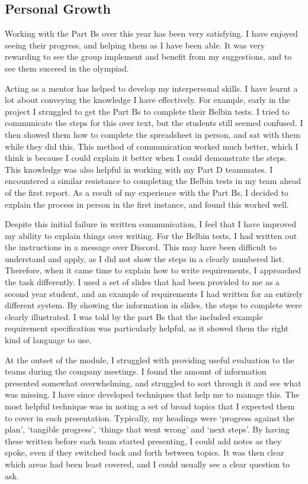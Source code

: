    \subsection{Personal Growth}\label{subsec:reflection-personal}
        Working with the Part Bs over this year has been very satisfying.
        I have enjoyed seeing their progress, and helping them as I have been able.
        It was very rewarding to see the group implement and benefit from my suggestions, and to see them succeed in the olympiad.

        Acting as a mentor has helped to develop my interpersonal skills.
        I have learnt a lot about conveying the knowledge I have effectively.
        For example, early in the project I struggled to get the Part Bs to complete their Belbin tests.
        I tried to communicate the steps for this over text, but the students still seemed confused.
        I then showed them how to complete the spreadsheet in person, and sat with them while they did this.
        This method of communication worked much better, which I think is because I could explain it better when I could demonstrate the steps.
        This knowledge was also helpful in working with my Part D teammates.
        I encountered a similar resistance to completing the Belbin tests in my team ahead of the first report.
        As a result of my experience with the Part Bs, I decided to explain the process in person in the first instance, and found this worked well.

        Despite this initial failure in written communication, I feel that I have improved my ability to explain things over writing.
        For the Belbin tests, I had written out the instructions in a message over Discord. %
        This may have been difficult to understand and apply, as I did not show the steps in a clearly numbered list.
        Therefore, when it came time to explain how to write requirements, I approached the task differently.
        I used a set of slides that had been provided to me as a second year student, and an example of requirements I had written for an entirely different system.
        By showing the information in slides, the steps to complete were clearly illustrated.
        I was told by the part Bs that the included example requirement specification was particularly helpful, as it showed them the right kind of language to use.

        At the outset of the module, I struggled with providing useful evaluation to the teams during the company meetings.
        I found the amount of information presented somewhat overwhelming, and struggled to sort through it and see what was missing.
        I have since developed techniques that help me to manage this.
        The most helpful technique was in noting a set of broad topics that I expected them to cover in each presentation.
        Typically, my headings were `progress against the plan', `tangible progress', `things that went wrong' and `next steps'.
        By having these written before each team started presenting, I could add notes as they spoke, even if they switched back and forth between topics. %
        It was then clear which areas had been least covered, and I could usually see a clear question to ask.

